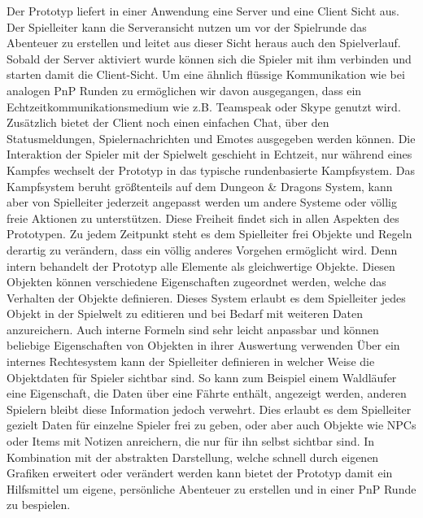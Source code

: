 Der Prototyp liefert in einer Anwendung eine Server und eine Client Sicht aus. Der Spielleiter kann die Serveransicht nutzen um vor der Spielrunde das Abenteuer zu erstellen und leitet aus dieser Sicht heraus auch den Spielverlauf. Sobald der Server aktiviert wurde können sich die Spieler mit ihm verbinden und starten damit die Client-Sicht. Um eine ähnlich flüssige Kommunikation wie bei analogen PnP Runden zu ermöglichen wir davon ausgegangen, dass ein Echtzeitkommunikationsmedium wie z.B. Teamspeak oder Skype genutzt wird. Zusätzlich bietet der Client noch einen einfachen Chat, über den Statusmeldungen, Spielernachrichten und Emotes ausgegeben werden können. 
Die Interaktion der Spieler mit der Spielwelt geschieht in Echtzeit, nur während eines Kampfes wechselt der Prototyp in das typische rundenbasierte Kampfsystem. Das Kampfsystem beruht größtenteils auf dem Dungeon \& Dragons System, kann aber von Spielleiter jederzeit angepasst werden um andere Systeme oder völlig freie Aktionen zu unterstützen.\newline
 Diese Freiheit findet sich in allen Aspekten des Prototypen. Zu jedem Zeitpunkt steht es dem Spielleiter frei Objekte und Regeln derartig zu verändern, dass ein völlig anderes Vorgehen ermöglicht wird. Denn intern behandelt der Prototyp alle Elemente als gleichwertige Objekte. Diesen Objekten können verschiedene Eigenschaften zugeordnet werden, welche das Verhalten der Objekte definieren. Dieses System erlaubt es dem Spielleiter jedes Objekt in der Spielwelt zu editieren und bei Bedarf mit weiteren Daten anzureichern. Auch interne Formeln sind sehr leicht anpassbar und können beliebige Eigenschaften von Objekten in ihrer Auswertung verwenden\newline
Über ein internes Rechtesystem kann der Spielleiter definieren in welcher Weise die Objektdaten für Spieler sichtbar sind. So kann zum Beispiel einem Waldläufer eine Eigenschaft, die Daten über eine Fährte enthält, angezeigt werden, anderen Spielern bleibt diese Information jedoch verwehrt. Dies erlaubt es dem Spielleiter gezielt Daten für einzelne Spieler frei zu geben, oder aber auch Objekte wie NPCs oder Items mit Notizen anreichern, die nur für ihn selbst sichtbar sind.\newline
In Kombination mit der abstrakten Darstellung, welche schnell durch eigenen Grafiken erweitert oder verändert werden kann bietet der Prototyp damit ein Hilfsmittel um eigene, persönliche Abenteuer zu erstellen und in einer PnP Runde zu bespielen.




